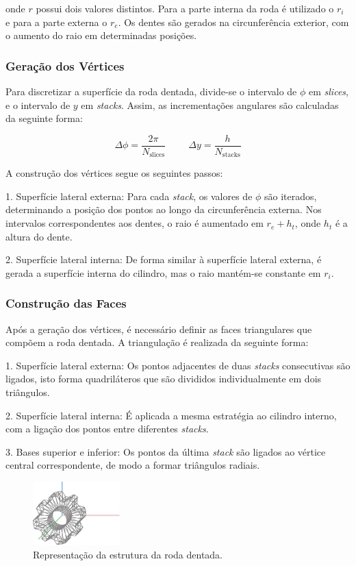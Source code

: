 \documentclass[12pt, a4paper]{article}
\begin{document}
onde $r$ possui dois valores distintos. Para a parte interna da roda é utilizado o $r_i$ e para a
parte externa o $r_e$. Os dentes são gerados na circunferência exterior, com o aumento do raio em
determinadas posições.

\subsubsection{Geração dos Vértices}

Para discretizar a superfície da roda dentada, divide-se o intervalo de $\phi$ em \emph{slices}, e
o intervalo de $y$ em \emph{stacks}. Assim, as incrementações angulares são calculadas da seguinte
forma:

$$
\Delta \phi = \frac{2\pi}{N_\text{slices}}
\hspace{1cm}
\Delta y = \frac{h}{N_\text{stacks}}
$$

A construção dos vértices segue os seguintes passos:

1. Superfície lateral externa: Para cada \emph{stack}, os valores de $\phi$ são iterados,
determinando a posição dos pontos ao longo da circunferência externa. Nos intervalos correspondentes
aos dentes, o raio é aumentado em $r_e + h_t$, onde $h_t$ é a altura do dente.

2. Superfície lateral interna: De forma similar à superfície lateral externa, é gerada a superfície
interna do cilindro, mas o raio mantém-se constante em $r_i$.

\subsubsection{Construção das Faces}

Após a geração dos vértices, é necessário definir as faces triangulares que compõem a roda dentada.
A triangulação é realizada da seguinte forma:

1. Superfície lateral externa: Os pontos adjacentes de duas \emph{stacks} consecutivas são
ligados, isto forma quadriláteros que são divididos individualmente em dois triângulos.

2. Superfície lateral interna: É aplicada a mesma estratégia ao cilindro interno, com a ligação
dos pontos entre diferentes \emph{stacks}.

3. Bases superior e inferior: Os pontos da última \emph{stack} são ligados ao vértice central
correspondente, de modo a formar triângulos radiais.

\begin{figure}[H]
    \centering
    \includegraphics[width=0.3\textwidth]{res/phase2/figures/gear.pdf}
    \caption{Representação da estrutura da roda dentada.}
\end{figure}
\end{document}
